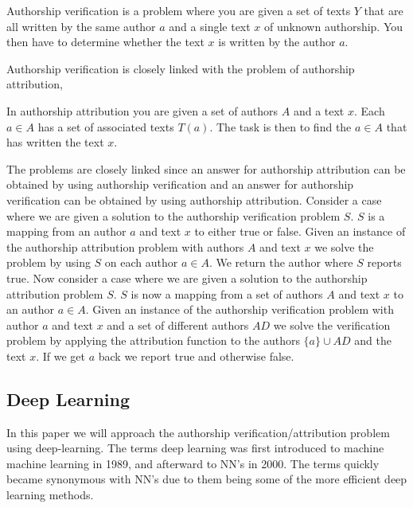 \begin{definition}

    Authorship verification is a problem where you are given a set of texts $Y$
    that are all written by the same author $a$ and a single text $x$ of unknown
    authorship. You then have to determine whether the text $x$ is written by
    the author $a$.

\end{definition}

Authorship verification is closely linked with the problem of authorship
attribution,

\begin{definition}

    In authorship attribution you are given a set of authors $A$ and a text $x$.
    Each $a \in A$ has a set of associated texts $T(a)$. The task is then to
    find the $a \in A$ that has written the text $x$.

\end{definition}

The problems are closely linked since an answer for authorship attribution can
be obtained by using authorship verification and an answer for authorship
verification can be obtained by using authorship attribution. Consider a case
where we are given a solution to the authorship verification problem $S$. $S$ is
a mapping from an author $a$ and text $x$ to either true or false. Given an
instance of the authorship attribution problem with authors $A$ and text $x$ we
solve the problem by using $S$ on each author $a \in A$. We return the author
where $S$ reports true. Now consider a case where we are given a solution to the
authorship attribution problem $S$. $S$ is now a mapping from a set of authors
$A$ and text $x$ to an author $a \in A$. Given an instance of the authorship
verification problem with author $a$ and text $x$ and a set of different authors
$AD$ we solve the verification problem by applying the attribution function to
the authors $\{a\} \cup AD$ and the text $x$. If we get $a$ back we report
true and otherwise false.

\subsection{Deep Learning} 

In this paper we will approach the authorship verification/attribution problem
using deep-learning. The terms deep learning was first introduced to machine
machine learning in 1989, and afterward to \gls{NN}'s in 2000. The terms quickly
became synonymous with \gls{NN}'s due to them being some of the more efficient
deep learning methods.\cite{Schmidhuber:2015} 

